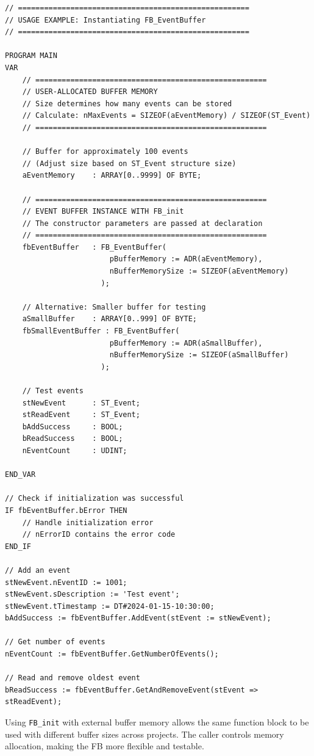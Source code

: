 \documentclass[11pt,a4paper]{article}
\begin{document}
\begin{lstlisting}
// =====================================================
// USAGE EXAMPLE: Instantiating FB_EventBuffer
// =====================================================

PROGRAM MAIN
VAR
    // =====================================================
    // USER-ALLOCATED BUFFER MEMORY
    // Size determines how many events can be stored
    // Calculate: nMaxEvents = SIZEOF(aEventMemory) / SIZEOF(ST_Event)
    // =====================================================
    
    // Buffer for approximately 100 events
    // (Adjust size based on ST_Event structure size)
    aEventMemory    : ARRAY[0..9999] OF BYTE;
    
    // =====================================================
    // EVENT BUFFER INSTANCE WITH FB_init
    // The constructor parameters are passed at declaration
    // =====================================================
    fbEventBuffer   : FB_EventBuffer(
                        pBufferMemory := ADR(aEventMemory),
                        nBufferMemorySize := SIZEOF(aEventMemory)
                      );
    
    // Alternative: Smaller buffer for testing
    aSmallBuffer    : ARRAY[0..999] OF BYTE;
    fbSmallEventBuffer : FB_EventBuffer(
                        pBufferMemory := ADR(aSmallBuffer),
                        nBufferMemorySize := SIZEOF(aSmallBuffer)
                      );
    
    // Test events
    stNewEvent      : ST_Event;
    stReadEvent     : ST_Event;
    bAddSuccess     : BOOL;
    bReadSuccess    : BOOL;
    nEventCount     : UDINT;
    
END_VAR

// Check if initialization was successful
IF fbEventBuffer.bError THEN
    // Handle initialization error
    // nErrorID contains the error code
END_IF

// Add an event
stNewEvent.nEventID := 1001;
stNewEvent.sDescription := 'Test event';
stNewEvent.tTimestamp := DT#2024-01-15-10:30:00;
bAddSuccess := fbEventBuffer.AddEvent(stEvent := stNewEvent);

// Get number of events
nEventCount := fbEventBuffer.GetNumberOfEvents();

// Read and remove oldest event
bReadSuccess := fbEventBuffer.GetAndRemoveEvent(stEvent => stReadEvent);
\end{lstlisting}

\begin{tipbox}
Using \texttt{FB\_init} with external buffer memory allows the same function block to be used with different buffer sizes across projects. The caller controls memory allocation, making the FB more flexible and testable.
\end{tipbox}
\end{document}
